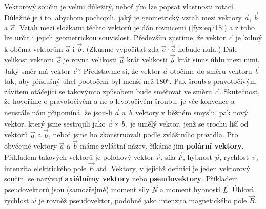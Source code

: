     Vektorový součin je velmi důležitý, neboť jím lze popsat vlastnosti rotací. Důležité je i to,
    abychom pochopili, jaký je geometrický vztah mezi vektory \(\vec{a}\), \(\vec{b}\) a
    \(\vec{c}\). Vztah mezi složkami těchto vektorů je dán rovnicemi (\ref{fyz:eq718}) a z toho lze
    určit i jejich geometrickou souvislost. Především zjistíme, že vektor \(\vec{c}\) je kolmý k
    oběma vektorům \(\vec{a}\) i \(\vec{b}\). (Zkusme vypočítat zda \(\vec{c}\cdot\vec{a}\) nebude
    nula.) Dále velikost vektoru \(\vec{c}\) je rovna velikosti \(\vec{a}\) krát velikosti
    \(\vec{b}\) krát sinus úhlu mezi nimi. Jaký směr má vektor \(\vec{c}\)? Představme si, že vektor
    \(\vec{a}\) otočíme do směru vektoru \(\vec{b}\) tak, aby příslušný úhel pootočení byl menší než
    \ang{180}. Pak šroub s pravotočivým závitem otáčející se takovýmto způsobem bude směřovat ve
    směru \(\vec{c}\). Skutečnost, že hovoříme o pravotočivěm a ne o levotočivém šroubu, je věc
    konvence a neustále nám připomíná, že jsou-li \(\vec{a}\) a \(\vec{b}\)  vektory v
    běžném smyslu, pak nový vektor, který jsme sestrojili jako \(\vec{a}\times\vec{b}\), je umělý
    vektor, jenž se trochu liší od vektorů \( \vec{a}\) a \(\vec{b}\), neboť jsme ho zkonstruovali
    podle zvláštního pravidla. Pro obyčejné vektory \(\vec{a}\) a \(\vec{b}\) máme zvláštní název,
    říkáme jim \textbf{polární vektory}. Příkladem takových vektorů je polohový vektor \(\vec{r}\),
    síla \(\vec{F}\), hybnost \(\vec{p}\), rychlost \(\vec{v}\), intenzita elektrického pole
    \(\vec{E}\) atd. Vektory, v jejichž definici je jeden vektorový součin, se nazývají
    \textbf{axiálnímy vektory} nebo \textbf{pseudovektory}. Příkladem pseudovektorů jsou
    (samozřejmě) moment síly \(\vec{N}\) a moment hybnosti \(\vec{L}\). Úhlová rychlost
    \(\vec{\omega}\) je rovněž pseudovektor, podobně jako intenzita magnetického pole \(\vec{B}\).

